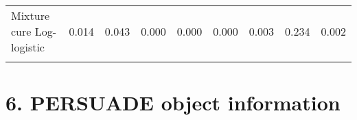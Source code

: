 \documentclass[
]{article}
\begin{document}
\begin{table}[H]
{\begin{tabular}[t]{lrrrrrrrr}
Mixture cure Log-logistic & 0.014 & 0.043 & 0.000 & 0.000 & 0.000 & 0.003 & 0.234 & 0.002\\
\cellcolor{gray!10}{Non-mixture cure Log-logistic} & \cellcolor{gray!10}{0.014} & \cellcolor{gray!10}{0.042} & \cellcolor{gray!10}{0.000} & \cellcolor{gray!10}{0.000} & \cellcolor{gray!10}{0.000} & \cellcolor{gray!10}{0.002} & \cellcolor{gray!10}{0.233} & \cellcolor{gray!10}{0.002}\\
\bottomrule
\end{tabular}}
\end{table}

\clearpage

\section{6. PERSUADE object
information}\label{persuade-object-information}
\end{document}
